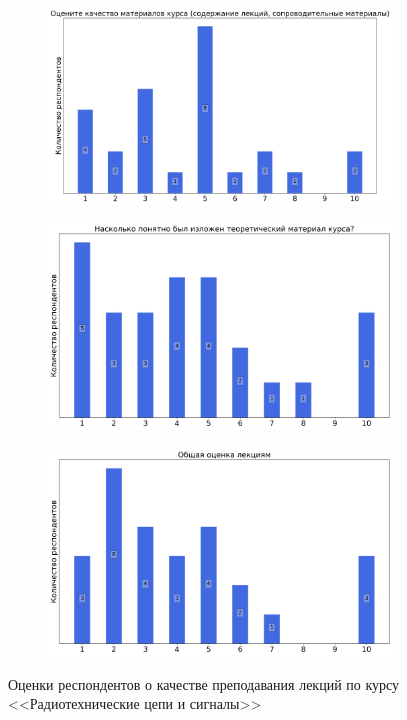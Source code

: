 \begin{figure}[H]
\begin{subfigure}[b]{0.45\textwidth}
				\includegraphics[width=\textwidth]{images/2 course/Радиотехнические цепи и сигналы/lecturer-marks-Филатов И.В.-1.png}
			\end{subfigure}
			\begin{subfigure}[b]{0.45\textwidth}
				\centering
				\includegraphics[width=\textwidth]{images/2 course/Радиотехнические цепи и сигналы/lecturer-marks-Филатов И.В.-2.png}
			\end{subfigure}	
			\begin{subfigure}[b]{0.45\textwidth}
				\centering
				\includegraphics[width=\textwidth]{images/2 course/Радиотехнические цепи и сигналы/lecturer-marks-Филатов И.В.-3.png}
			\end{subfigure}
			\caption{Оценки респондентов о качестве преподавания лекций по курсу <<Радиотехнические цепи и сигналы>>}
		\end{figure}


